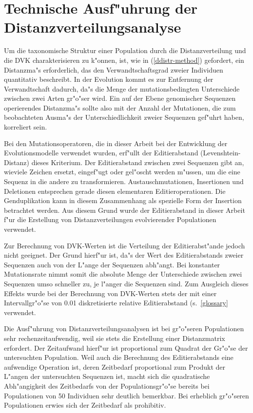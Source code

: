 

\section{Technische Ausf"uhrung der Distanzverteilungsanalyse}

Um die taxonomische Struktur einer Population durch die Distanzverteilung und die DVK charakterisieren
zu k"onnen, ist, wie in (\ref{ddistr-method}) gefordert, ein Distanzma"s erforderlich, das den
Verwandtschaftsgrad zweier Individuen quantitativ beschreibt. In der Evolution kommt es zur
Entfernung der Verwandtschaft dadurch, da"s die Menge der mutationsbedingten Unterschiede zwischen
zwei Arten gr"o"ser wird. Ein auf der Ebene genomischer Sequenzen operierendes Distanzma"s sollte
also mit der Anzahl der Mutationen, die zum beobachteten Ausma"s der Unterschiedlichkeit zweier
Sequenzen gef"uhrt haben, korreliert sein.

Bei den Mutationsoperatoren, die in dieser Arbeit bei der Entwicklung der Evolutionsmodelle verwendet
wurden, erf"ullt der Editierabstand (Levenshtein-Distanz) dieses Kriterium. Der Editierabstand zwischen
zwei Sequenzen gibt an, wieviele Zeichen ersetzt, eingef"ugt oder gel"oscht werden m"ussen, um die
eine Sequenz in die andere zu transformieren. Austauschmutationen, Insertionen und Deletionen entsprechen
gerade diesen elementaren Editieroperationen. Die Genduplikation kann in diesem Zusammenhang als
spezielle Form der Insertion betrachtet werden.
Aus diesem Grund wurde der Editierabstand in dieser Arbeit f"ur die Erstellung von Distanzverteilungen
evolvierender Populationen verwendet.

Zur Berechnung von DVK-Werten ist die Verteilung der Editierabst"ande jedoch nicht geeignet. Der
Grund hierf"ur ist, da"s der Wert des Editierabstands zweier Sequenzen auch von der L"ange der
Sequenzen abh"angt. Bei konstanter Mutationsrate nimmt somit die absolute Menge der Unterschiede
zwischen zwei Sequenzen umso schneller zu, je l"anger die Sequenzen sind. Zum Ausgleich dieses
Effekts wurde bei der Berechnung von DVK-Werten stets der mit einer Intervallgr"o"se von 0.01 diskretisierte
relative Editierabstand (s.\ \ref{glossary} verwendet.

Die Ausf"uhrung von Distanzverteilungsanalysen ist bei gr"o"seren Populationen sehr rechenzeitaufwendig, weil
sie stets die Erstellung einer Distanzmatrix erfordert. Der Zeitaufwand hierf"ur ist proportional zum Quadrat
der Gr"o"se der untersuchten Population. Weil auch die Berechnung des Editierabstands eine aufwendige Operation
ist, deren Zeitbedarf proportional zum Produkt der L"angen der untersuchten Sequenzen ist, macht sich die
quadratische Abh"angigkeit des Zeitbedarfs von der Populationsgr"o"se bereits bei Populationen von 50 Individuen
sehr deutlich bemerkbar. Bei erheblich gr"o"seren Populationen erwies sich der Zeitbedarf als prohibitiv.

